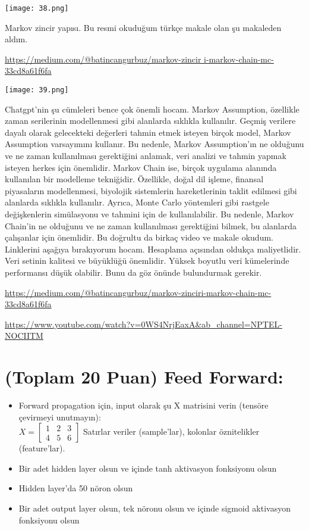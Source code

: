 \documentclass[11pt]{article}
\begin{document}
\begin{center}
    \texttt{[image: 38.png]}
\end{center}

Markov zincir yapısı. Bu resmi okuduğum türkçe makale olan şu makaleden aldım.

\url{https://medium.com/@batincangurbuz/markov-zincir i-markov-chain-mc-33cd8a61f6fa}

\begin{center}
    \texttt{[image: 39.png]}
\end{center}

Chatgpt'nin şu cümleleri bence çok önemli hocam. Markov Assumption, özellikle zaman serilerinin modellenmesi gibi alanlarda sıklıkla kullanılır. Geçmiş verilere dayalı olarak gelecekteki değerleri tahmin etmek isteyen birçok model, Markov Assumption varsayımını kullanır. Bu nedenle, Markov Assumption'ın ne olduğunu ve ne zaman kullanılması gerektiğini anlamak, veri analizi ve tahmin yapmak isteyen herkes için önemlidir. Markov Chain ise, birçok uygulama alanında kullanılan bir modelleme tekniğidir. Özellikle, doğal dil işleme, finansal piyasaların modellenmesi, biyolojik sistemlerin hareketlerinin taklit edilmesi gibi alanlarda sıklıkla kullanılır. Ayrıca, Monte Carlo yöntemleri gibi rastgele değişkenlerin simülasyonu ve tahmini için de kullanılabilir. Bu nedenle, Markov Chain'in ne olduğunu ve ne zaman kullanılması gerektiğini bilmek, bu alanlarda çalışanlar için önemlidir. Bu doğrultu da birkaç video ve makale okudum. Linklerini aşağıya bırakıyorum hocam. Hesaplama açısından oldukça maliyetlidir. Veri setinin kalitesi ve büyüklüğü önemlidir. Yüksek boyutlu veri kümelerinde performansı düşük olabilir. Bunu da göz önünde bulundurmak gerekir.

\url{https://medium.com/@batincangurbuz/markov-zinciri-markov-chain-mc-33cd8a61f6fa}

\url{https://www.youtube.com/watch?v=0WS4NrjEaxA&ab_channel=NPTEL-NOCIITM}


\section{(Toplam 20 Puan) Feed Forward:}
 
\begin{itemize}
    \item Forward propagation için, input olarak şu X matrisini verin (tensöre çevirmeyi unutmayın):\\
    $X = \begin{bmatrix}
        1 & 2 & 3\\
        4 & 5 & 6
        \end{bmatrix}$
    Satırlar veriler (sample'lar), kolonlar öznitelikler (feature'lar).
    \item Bir adet hidden layer olsun ve içinde tanh aktivasyon fonksiyonu olsun
    \item Hidden layer'da 50 nöron olsun
    \item Bir adet output layer olsun, tek nöronu olsun ve içinde sigmoid aktivasyon fonksiyonu olsun
\end{itemize}
\end{document}
